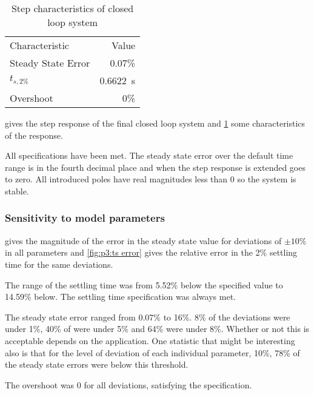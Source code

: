 \begin{table}[h]
	\centering
	\begin{tabular}{lr}
		\toprule
		Characteristic&Value\\
		\cmidrule(r){1-1}\cmidrule(l){2-2}
		Steady State Error & 0.07\%\\
		$t_{s,2\%}$ & \SI{ 0.6622}{\second}\\
		Overshoot & 0\%\\
		\bottomrule
	\end{tabular}
	\caption{Step characteristics of closed loop system}
	\label{tab:p3:step}
\end{table}
 gives the step response of the final closed loop system and \cref{tab:p3:step} some characteristics of the response.

All specifications have been met. The steady state error over the default \matlab time range is in the fourth decimal place and when the step response is extended goes to zero. All introduced poles have real magnitudes less than 0 so the system is stable.

\subsubsection*{Sensitivity to model parameters}

 gives the magnitude of the error in the steady state value for deviations of $\pm 10\%$ in all parameters and \cref{fig:p3:ts error} gives the relative error in the 2\% settling time for the same deviations.

The range of the settling time was from 5.52\% below the specified value to 14.59\% below. The settling time specification was always met.

The steady state error ranged from 0.07\% to 16\%. 8\% of the deviations were under 1\%, 40\% of were under 5\% and 64\% were under 8\%. Whether or not this is acceptable depends on the application. One statistic that might be interesting also is that for the level of deviation of each individual parameter, 10\%, 78\% of the steady state errors were below this threshold.

The overshoot was 0 for all deviations, satisfying the specification.